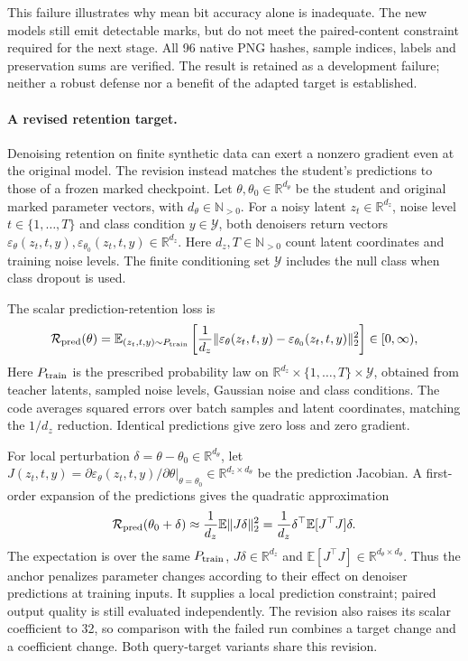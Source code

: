 This failure illustrates why mean bit accuracy alone is inadequate. The new models still emit detectable marks, but do not meet the paired-content constraint required for the next stage. All 96 native PNG hashes, sample indices, labels and preservation sums are verified. The result is retained as a development failure; neither a robust defense nor a benefit of the adapted target is established.

\paragraph{A revised retention target.}
Denoising retention on finite synthetic data can exert a nonzero gradient even at the original model. The revision instead matches the student's predictions to those of a frozen marked checkpoint. Let $\theta,\theta_0\in\mathbb R^{d_\theta}$ be the student and original marked parameter vectors, with $d_\theta\in\mathbb N_{>0}$. For a noisy latent $z_t\in\mathbb R^{d_z}$, noise level $t\in\{1,\ldots,T\}$ and class condition $y\in\mathcal Y$, both denoisers return vectors $\varepsilon_\theta(z_t,t,y),\varepsilon_{\theta_0}(z_t,t,y)\in\mathbb R^{d_z}$. Here $d_z,T\in\mathbb N_{>0}$ count latent coordinates and training noise levels. The finite conditioning set $\mathcal Y$ includes the null class when class dropout is used.

The scalar prediction-retention loss is
\begin{equation}\label{eq:prediction-retention-loss}
 \mathcal R_{\rm pred}(\theta)=
 \mathbb E_{(z_t,t,y)\sim P_{\rm train}}
 \left[\frac1{d_z}
 \|\varepsilon_\theta(z_t,t,y)-\varepsilon_{\theta_0}(z_t,t,y)\|_2^2\right]
 \in[0,\infty),
\end{equation}
Here $P_{\rm train}$ is the prescribed probability law on $\mathbb R^{d_z}\times\{1,\ldots,T\}\times\mathcal Y$, obtained from teacher latents, sampled noise levels, Gaussian noise and class conditions. The code averages squared errors over batch samples and latent coordinates, matching the $1/d_z$ reduction. Identical predictions give zero loss and zero gradient.

For local perturbation $\delta=\theta-\theta_0\in\mathbb R^{d_\theta}$, let
$J(z_t,t,y)=\left.\partial\varepsilon_\theta(z_t,t,y)/\partial\theta\right|_{\theta=\theta_0}
\in\mathbb R^{d_z\times d_\theta}$ be the prediction Jacobian. A first-order expansion of the predictions gives the quadratic approximation
\begin{equation}
\label{eq:prediction-retention-rms}
 \mathcal R_{\rm pred}(\theta_0+\delta)
 \approx \frac1{d_z}\mathbb E\|J\delta\|_2^2
 =\frac1{d_z}\delta^\top\mathbb E[J^\top J]\delta.
\end{equation}
The expectation is over the same $P_{\rm train}$, $J\delta\in\mathbb R^{d_z}$ and $\mathbb E[J^\top J]\in\mathbb R^{d_\theta\times d_\theta}$. Thus the anchor penalizes parameter changes according to their effect on denoiser predictions at training inputs. It supplies a local prediction constraint; paired output quality is still evaluated independently. The revision also raises its scalar coefficient to 32, so comparison with the failed run combines a target change and a coefficient change. Both query-target variants share this revision.

